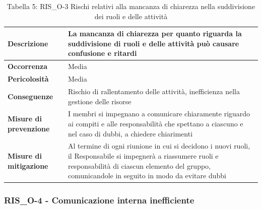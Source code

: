 \documentclass[a4paper,10pt]{article}
\begin{document}
\begin{table}[H]
\centering
\renewcommand{\arraystretch}{1.3}

\begin{tabularx}{\textwidth}{|p{4cm}|X|}
\hline
\textbf{Descrizione} & 
La mancanza di chiarezza per quanto riguarda la suddivisione di ruoli e delle attività può causare confusione e ritardi \\ \hline

\textbf{Occorrenza} & Media \\ \hline

\textbf{Pericolosità} & Media \\ \hline

\textbf{Conseguenze} & 
Rischio di rallentamento delle attività, inefficienza nella gestione delle risorse \\ \hline

\textbf{Misure di prevenzione} & I membri si impegnano a comunicare chiaramente riguardo ai compiti e alle responsabilità che spettano a ciascuno e nel caso di dubbi, a chiedere chiarimenti \\ \hline

\textbf{Misure di mitigazione} &
Al termine di ogni riunione in cui si decidono i nuovi ruoli, il Responsabile si impegnerà a riassumere ruoli e responsabilità di ciascun elemento del gruppo, comunicandole in seguito in modo da evitare dubbi \\ \hline

\end{tabularx}

\caption{Tabella 5: RIS\_O-3 Rischi relativi alla mancanza di chiarezza nella suddivisione dei ruoli e delle attività}
\end{table}


\subsubsection{RIS\_O-4 - Comunicazione interna inefficiente}
\end{document}
